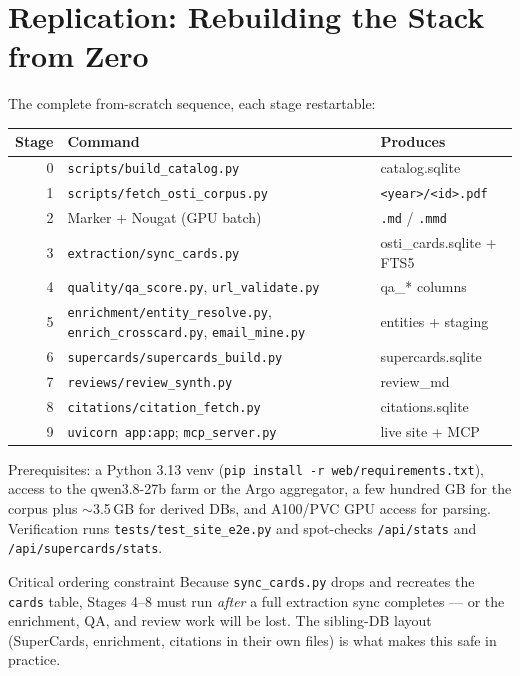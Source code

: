 \documentclass[11pt,letterpaper]{article}
\newcommand{\code}[1]{\texttt{\small #1}}
\begin{document}
\clearpage
\section{Replication: Rebuilding the Stack from Zero}

The complete from-scratch sequence, each stage restartable:

\begin{center}
\small
\begin{tabular}{@{}r l l@{}}
\toprule
\textbf{Stage} & \textbf{Command} & \textbf{Produces} \\
\midrule
0 & \code{scripts/build\_catalog.py}             & catalog.sqlite \\
1 & \code{scripts/fetch\_osti\_corpus.py}        & \code{<year>/<id>.pdf} \\
2 & Marker + Nougat (GPU batch)                  & \code{.md} / \code{.mmd} \\
3 & \code{extraction/sync\_cards.py}             & osti\_cards.sqlite + FTS5 \\
4 & \code{quality/qa\_score.py}, \code{url\_validate.py} & qa\_* columns \\
5 & \code{enrichment/entity\_resolve.py}, \code{enrich\_crosscard.py}, \code{email\_mine.py} & entities + staging \\
6 & \code{supercards/supercards\_build.py}       & supercards.sqlite \\
7 & \code{reviews/review\_synth.py}              & review\_md \\
8 & \code{citations/citation\_fetch.py}          & citations.sqlite \\
9 & \code{uvicorn app:app}; \code{mcp\_server.py} & live site + MCP \\
\bottomrule
\end{tabular}
\end{center}

\noindent Prerequisites: a Python 3.13 venv (\code{pip install -r web/requirements.txt}),
access to the qwen3.8-27b farm or the Argo aggregator, a few hundred GB for the
corpus plus $\sim$3.5\,GB for derived DBs, and A100/PVC GPU access for parsing.
Verification runs \code{tests/test\_site\_e2e.py} and spot-checks
\code{/api/stats} and \code{/api/supercards/stats}.

\begin{notebox}{Critical ordering constraint}
Because \code{sync\_cards.py} drops and recreates the \code{cards} table, Stages 4--8
must run \emph{after} a full extraction sync completes --- or the enrichment, QA, and
review work will be lost. The sibling-DB layout (SuperCards, enrichment, citations in
their own files) is what makes this safe in practice.
\end{notebox}
\end{document}
